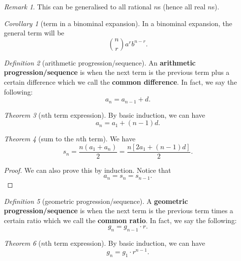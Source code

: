 \documentclass[8pt]{article}
\theoremstyle{remark}
\newtheorem{theorem}{Theorem}[section]
\newtheorem{corollary}[theorem]{Corollary}
\newtheorem{definition}[theorem]{Definition}
\newtheorem*{remark}{Remark}
\begin{document}
        \begin{remark}
            This can be generalised to all rational $n$s (hence all real $n$s).
        \end{remark}
        
        \begin{corollary}[term in a binominal expansion]
            In a binominal expansion, the general term will be
            $$
                \binom{n}{r} a^r b^{n - r}.
            $$
        \end{corollary}

        \begin{definition}[arithmetic progression/sequence]
            An \textbf{arithmetic progression/sequence} is when the next term is the previous term plus a certain difference which we call the \textbf{common difference}. In fact, we say the following:
            $$
                a_n = a_{n - 1} + d.
            $$
        \end{definition}

        \begin{theorem}[$n$th term expression]
            By basic induction, we can have
            $$
                a_n = a_1 + (n - 1)d.
            $$
        \end{theorem}

        \begin{theorem}[sum to the $n$th term]
            We have
            $$
                s_n = \frac{n(a_1 + a_n)}{2} = \frac{n [2a_1 + (n - 1)d]}{2}.
            $$
            \begin{proof}
                We can also prove this by induction. Notice that
                $$
                    a_n = s_n = s_{n - 1}.
                $$
            \end{proof}
        \end{theorem}

        \begin{definition}[geometric progression/sequence]
            A \textbf{geometric progression/sequence} is when the next term is the previous term times a certain ratio which we call the \textbf{common ratio}. In fact, we say the following:
            $$
                g_n = g_{n - 1} \cdot r.
            $$
        \end{definition}

        \begin{theorem}[$n$th term expression]
            By basic induction, we can have
            $$
                g_n = g_1 \cdot r^{n - 1}.
            $$
        \end{theorem}
\end{document}
